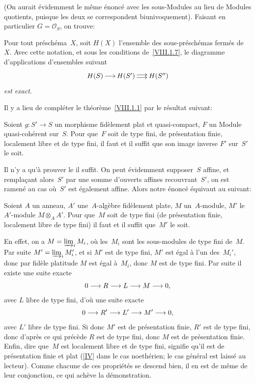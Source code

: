 (On aurait \'evidemment le m\^eme \'enonc\'e avec les
sous-Modules au lieu de Modules quotients, puisque les deux se
correspondent biunivoquement). Faisant en particulier
$G=\mathcal{O}_{S}$, on trouve:

\begin{corollaire}
\label{VIII.1.9}
Pour tout pr\'esch\'ema~$X$, soit $H(X)$ l'ensemble des
sous-pr\'esch\'emas ferm\'es de~$X$. Avec cette notation, et
sous les conditions de~\ref{VIII.1.7}, le diagramme d'applications
d'ensembles suivant
$$
\xymatrix@C=.5cm{{H(S)}\ar[r]&{H(S')}\ar@<2pt>[r]\ar@<-2pt>[r]&{H(S'')}}
$$
\emph{est exact}.
\end{corollaire}

Il y a lieu de compl\'eter le th\'eor\`eme~\ref{VIII.1.1} par le
r\'esultat suivant:

\begin{proposition}
\label{VIII.1.10}
Soient $g\colon S'\to S$ un morphisme fid\`element plat et
quasi-compact, $F$ un Module quasi-coh\'erent sur~$S$. Pour que~$F$
soit de type fini, \resp de pr\'esentation finie, \resp localement
libre et de type fini, il faut et il suffit que son image inverse $F'$
sur~$S'$ le soit.
\end{proposition}

Il n'y a qu'\`a prouver le \og il suffit\fg. On peut \'evidemment
supposer~$S$ affine,
et rempla\c cant alors~$S'$ par
une
somme d'ouverts affines recouvrant~$S'$, on est ramen\'e au cas
o\`u~$S'$ est \'egalement affine. Alors notre \'enonc\'e
\'equivaut au suivant:

\begin{corollaire}
\label{VIII.1.11}
Soient $A$ un anneau, $A'$ une~$A$-alg\`ebre fid\`element plate,
$M$ un~$A$-module, $M'$ le~$A'$-module $M\otimes_{A}A'$. Pour que~$M$
soit de type fini (\resp de pr\'esentation finie, \resp localement
libre de type fini) il faut et il suffit que~$M'$ le soit.
\end{corollaire}

En effet, on a $M=\varinjlim_i M_{i}$, o\`u les~$M_{i}$
sont les sous-modules de type fini de~$M$. Par suite
$M'=\varinjlim_i M_{i}'$, et si $M'$ est de type fini, $M'$
est \'egal \`a l'un des~$M_{i}'$, donc par fid\`ele platitude
$M$ est \'egal \`a~$M_{i}$, donc $M$ est de type fini. Par suite
il existe une suite exacte
$$
0\to R\to L\to M\to 0\quoi,
$$
avec $L$ libre de type fini, d'o\`u une suite exacte
$$
0\to R'\to L'\to M'\to 0\quoi,
$$
avec $L'$ libre de type fini. Si donc $M'$ est de pr\'esentation
finie, $R'$ est de type fini, donc d'apr\`es ce qui pr\'ec\`ede
$R$ est de type fini, donc $M$ est de pr\'esentation finie. Enfin,
dire que~$M$ est localement libre et de type fini, signifie qu'il est
de pr\'esentation finie et plat (\cf \ref{IV} dans le cas
noeth\'erien; le cas g\'en\'eral est laiss\'e au
lecteur). Comme chacune de ces propri\'et\'es se descend bien, il
en est de m\^eme de leur conjonction, ce qui ach\`eve la
d\'emonstration.

